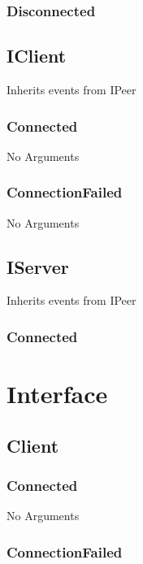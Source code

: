 \subsubsection{Disconnected}
\begin{messagedef}
\end{messagedef}

\subsection{IClient}
Inherits events from IPeer

\subsubsection{Connected}
No Arguments


\subsubsection{ConnectionFailed}
No Arguments

\subsection{IServer}
Inherits events from IPeer

\subsubsection{Connected}
\begin{messagedef}
\end{messagedef}

\section{Interface}

\subsection{Client}

\subsubsection{Connected}
No Arguments

\subsubsection{ConnectionFailed}
\begin{messagedef}
\end{messagedef}
